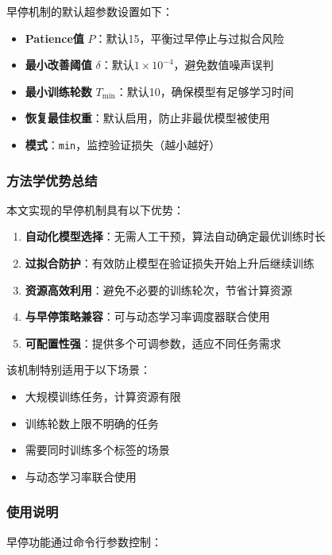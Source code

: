 早停机制的默认超参数设置如下：

\begin{itemize}
    \item \textbf{Patience值} $P$：默认15，平衡过早停止与过拟合风险
    \item \textbf{最小改善阈值} $\delta$：默认$1 \times 10^{-4}$，避免数值噪声误判
    \item \textbf{最小训练轮数} $T_{\text{min}}$：默认10，确保模型有足够学习时间
    \item \textbf{恢复最佳权重}：默认启用，防止非最优模型被使用
    \item \textbf{模式}：\texttt{min}，监控验证损失（越小越好）
\end{itemize}

\subsubsection{方法学优势总结}

本文实现的早停机制具有以下优势：

\begin{enumerate}
    \item \textbf{自动化模型选择}：无需人工干预，算法自动确定最优训练时长
    \item \textbf{过拟合防护}：有效防止模型在验证损失开始上升后继续训练
    \item \textbf{资源高效利用}：避免不必要的训练轮次，节省计算资源
    \item \textbf{与早停策略兼容}：可与动态学习率调度器联合使用
    \item \textbf{可配置性强}：提供多个可调参数，适应不同任务需求
\end{enumerate}

该机制特别适用于以下场景：

\begin{itemize}
    \item 大规模训练任务，计算资源有限
    \item 训练轮数上限不明确的任务
    \item 需要同时训练多个标签的场景
    \item 与动态学习率联合使用
\end{itemize}

\subsubsection{使用说明}

早停功能通过命令行参数控制：

